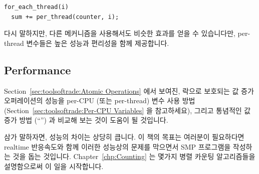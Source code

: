 \vspace{5pt}
\begin{minipage}[t]{\columnwidth}
\small
\begin{verbatim}
for_each_thread(i)
  sum += per_thread(counter, i);
\end{verbatim}
\end{minipage}
\vspace{5pt}

다시 말하지만, 다른 메커니즘을 사용해서도 비슷한 효과를 얻을 수 있습니다만,
per-thread 변수들은 높은 성능과 편리성을 함께 제공합니다.

\subsection{Performance}
\label{sec:toolsoftrade:Performance}

Section~\ref{sec:toolsoftrade:Atomic Operations}
에서 보여진, 락으로 보호되는 값 증가 오퍼레이션의 성능을 per-CPU (또는
per-thread) 변수 사용 방법
(Section~\ref{sec:toolsoftrade:Per-CPU Variables} 을 참고하세요), 그리고
통념적인 값 증가 방법 (``'') 과 비교해 보는 것이 도움이 될 것입니다.

삼가 말하자면, 성능의 차이는 상당히 큽니다.
이 책의 목표는 여러분이 필요하다면 realtime 반응속도와 함께 이러한 성능상의
문제를 막으면서 SMP 프로그램을 작성하는 것을 돕는 것입니다.
Chapter~\ref{chp:Counting} 는 몇가지 병렬 카운팅 알고리즘들을 설명함으로써 이
일을 시작합니다.

